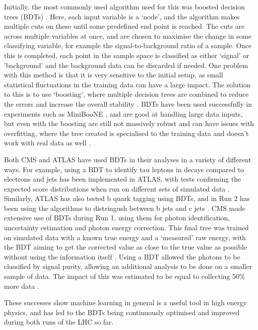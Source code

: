 \documentclass[12pt]{article}
\begin{document}
Initially, the most commonly used algorithm used for this was boosted decision trees (BDTs) \cite{ml7}. Here, each input variable is a `node', and the algorithm makes multiple cuts on these until some predefined end point is reached. The cuts are across multiple variables at once, and are chosen to maximise the change in some classifying variable, for example the signal-to-background ratio of a sample. Once this is completed, each point in the sample space is classified as either `signal' or 'background' and the background data can be discarded if needed. One problem with this method is that it is very sensitive to the initial setup, as small statistical fluctuations in the training data can have a large impact. The solution to this is to use `boosting', where multiple decision trees are combined to reduce the errors and increase the overall stability \cite{ml8}. BDTs have been used successfully in experiments such as MiniBooNE \cite{ml2}, and are good at handling large data inputs, but even with the boosting are still not massively robust and can have issues with overfitting, where the tree created is specialised to the training data and doesn't work with real data as well \cite{ml1}. 

Both CMS and ATLAS have used BDTs in their analyses in a variety of different ways. For example, using a BDT to identify tau leptons in decays compared to electrons and jets has been implemented in ATLAS, with tests confirming the expected score distributions when run on different sets of simulated data \cite{ml4}. Similarly, ATLAS has also tested b quark tagging using BDTs, and in Run 2 has been using the algorithms to distringush between b jets and c jets \cite{ml5}. CMS made extensive use of BDTs during Run 1, using them for photon identification, uncertainty estimation and photon energy correction. This final tree was trained on simulated data with a known true energy and a `measured' raw energy, with the BDT aiming to get the corrected value as close to the true value as possible without using the information itself \cite{ml6}. Using a BDT allowed the photons to be classified by signal purity, allowing an additional analysis to be done on a smaller sample of data. The impact of this was estimated to be equal to collecting 50$\%$ more data \cite{mlreview}.


These successes show machine learning in general is a useful tool in high energy physics, and has led to the BDTs being continuously optimised and improved during both runs of the LHC so far. 
\end{document}
